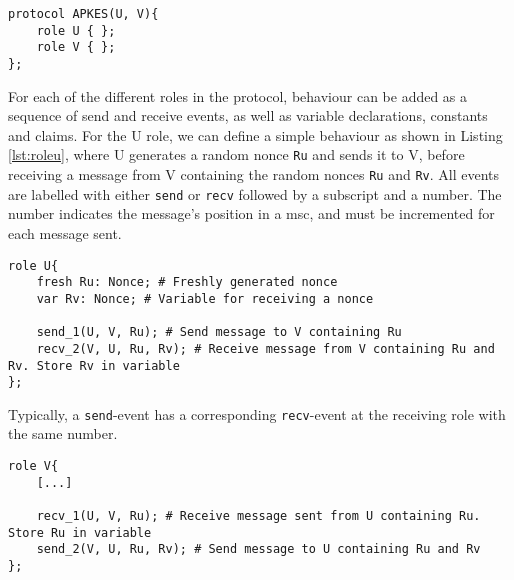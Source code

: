 \begin{lstlisting}[caption={Example of the structure of a protocol modelled in Scyther, consisting of roles with different behaviours.}, label={lst:example}]
protocol APKES(U, V){
	role U { };
	role V { };  
};
\end{lstlisting}

For each of the different roles in the protocol, behaviour can be added as a sequence of send and receive events, as well as variable declarations, constants and claims. For the U role, we can define a simple behaviour as shown in Listing \ref{lst:roleu}, where U generates a random nonce \texttt{Ru} and sends it to V, before receiving a message from V containing the random nonces \texttt{Ru} and \texttt{Rv}. All events are labelled with either \texttt{send} or \texttt{recv} followed by a subscript and a number. The number indicates the message's position in a \gls{msc}, and must be incremented for each message sent.\newline

\newpage

\begin{lstlisting}[caption={Terms can be generated, and sent and received when communicating with other agents.}, label={lst:roleu}]
role U{
	fresh Ru: Nonce; # Freshly generated nonce
	var Rv: Nonce; # Variable for receiving a nonce
	
	send_1(U, V, Ru); # Send message to V containing Ru
	recv_2(V, U, Ru, Rv); # Receive message from V containing Ru and Rv. Store Rv in variable
};
\end{lstlisting}



Typically, a \texttt{send}-event has a corresponding \texttt{recv}-event at the receiving role with the same number.\newline


\begin{lstlisting}[caption={Corresponding events in role V to events in role U.}]
role V{
	[...]
	
	recv_1(U, V, Ru); # Receive message sent from U containing Ru. Store Ru in variable
	send_2(V, U, Ru, Rv); # Send message to U containing Ru and Rv
};
\end{lstlisting}


